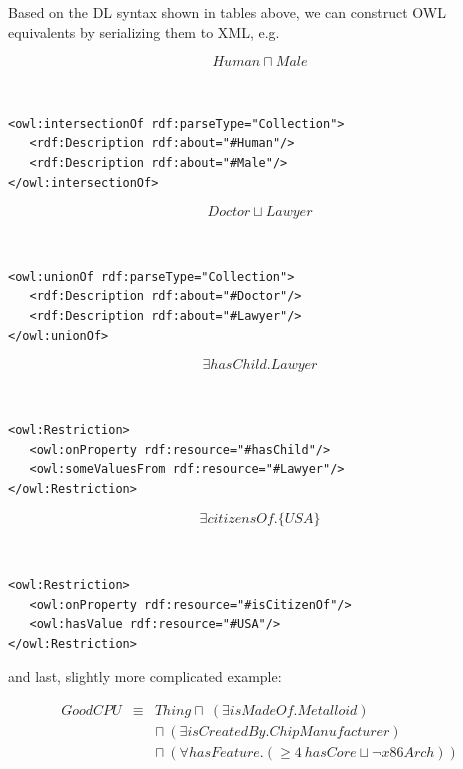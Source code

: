 \newpage

\noindent Based on the DL syntax shown in tables above, we can construct OWL equivalents by serializing them to XML, e.g.

\[
\mathit{Human} \sqcap \mathit{Male}
\]

{\tt \small
\begin{verbatim}
<owl:intersectionOf rdf:parseType="Collection">
   <rdf:Description rdf:about="#Human"/>
   <rdf:Description rdf:about="#Male"/>
</owl:intersectionOf>
\end{verbatim}
}

\[
\mathit{Doctor} \sqcup \mathit{Lawyer}
\]

{\tt \small
\begin{verbatim}
<owl:unionOf rdf:parseType="Collection">
   <rdf:Description rdf:about="#Doctor"/>
   <rdf:Description rdf:about="#Lawyer"/>
</owl:unionOf>
\end{verbatim}
}

\[
\exists \mathit{hasChild}.\mathit{Lawyer}
\]

{\tt \small
\begin{verbatim}
<owl:Restriction>
   <owl:onProperty rdf:resource="#hasChild"/>
   <owl:someValuesFrom rdf:resource="#Lawyer"/>
</owl:Restriction>
\end{verbatim}
}

\[
\exists \mathit{citizensOf}.\{\mathit{USA}\}
\]

{\tt \small
\begin{verbatim}
<owl:Restriction>
   <owl:onProperty rdf:resource="#isCitizenOf"/>
   <owl:hasValue rdf:resource="#USA"/>
</owl:Restriction>
\end{verbatim}
}

\bigskip

\noindent and last, slightly more complicated example:

\[
\begin{array}{lcl} 
    \mathit{GoodCPU}    & \equiv    & \mathit{Thing} \sqcap~ (\exists \mathit{isMadeOf}.\mathit{Metalloid}) \\ 
                        &           & \sqcap~ (\exists \mathit{isCreatedBy}.\mathit{ChipManufacturer}) \\
                        &           & \sqcap~ (\forall \mathit{hasFeature}.(\geq 4~ \mathit{hasCore} \sqcup \lnot \mathit{x86Arch}))
\end{array}
\]

\newpage

